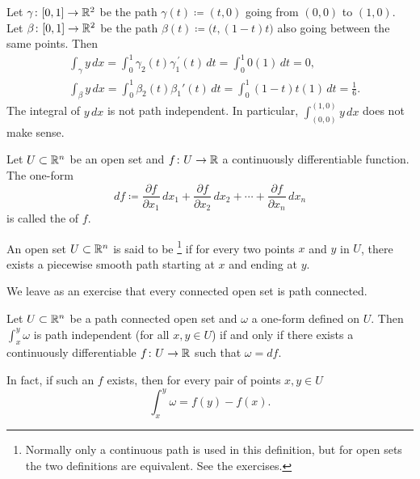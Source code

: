 \begin{example}
Let $\gamma \colon [0,1] \to {\mathbb{R}}^2$ be the path $\gamma(t) \coloneqq (t,0)$
going from $(0,0)$ to $(1,0)$.  Let $\beta \colon [0,1] \to {\mathbb{R}}^2$ be the path
$\beta(t) \coloneqq \bigl(t,(1-t)t\bigr)$ also going between the same points.  Then
\begin{align*}
& \int_\gamma y \, dx = 
\int_0^1 \gamma_2(t) \gamma_1^{\:\prime}(t) \, dt
=
\int_0^1 0 (1) \, dt = 0 ,\\
& \int_\beta y \, dx = 
\int_0^1 \beta_2(t) \beta_1'(t) \, dt
=
\int_0^1 (1-t)t(1) \, dt = \frac{1}{6} .
\end{align*}
The integral of $y\,dx$ is not path independent.
In particular,
$\int_{(0,0)}^{(1,0)} y\,dx$ does not make sense.
\end{example}

\begin{defn}
Let $U \subset {\mathbb{R}}^n$ be an open set and $f \colon U \to {\mathbb{R}}$ a 
continuously differentiable function.  The one-form
\begin{equation*}
df \coloneqq
\frac{\partial f}{\partial x_1} \, dx_1 + 
\frac{\partial f}{\partial x_2} \, dx_2 + \cdots +
\frac{\partial f}{\partial x_n} \, dx_n 
\end{equation*}
is called the \emph{} of $f$.

An open set $U \subset {\mathbb{R}}^n$ is said to be \emph{}%
\footnote{Normally only a continuous path is used in this definition, but
for open sets the two definitions are equivalent.  See the exercises.}
if for every two points $x$ and $y$ in $U$, there exists a piecewise smooth
path starting at $x$ and ending at $y$.
\end{defn}

We leave as an exercise that every connected open set is path
connected.

\begin{prop} \label{mv:prop:pathinddf}
Let $U \subset {\mathbb{R}}^n$ be a path connected open set and $\omega$ a one-form
defined on $U$.  Then
$\int_x^y \omega$
is path independent (for all $x,y \in U$) if and only if there exists
a continuously differentiable $f \colon U \to {\mathbb{R}}$ such that $\omega = df$.

In fact, if such an $f$ exists, then for every pair of points $x,y \in U$
\begin{equation*}
\int_{x}^y \omega = f(y)-f(x) .
\end{equation*}
\end{prop}

